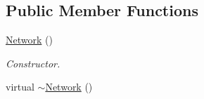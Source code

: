 \subsection*{Public Member Functions}
\begin{DoxyCompactItemize}
\item 
\hypertarget{classNetwork_a3cc2fb4f8fa4d507077e8da85ce5a1c8}{
\hyperlink{classNetwork_a3cc2fb4f8fa4d507077e8da85ce5a1c8}{Network} ()}
\label{classNetwork_a3cc2fb4f8fa4d507077e8da85ce5a1c8}

\begin{DoxyCompactList}\small\item\em Constructor. \item\end{DoxyCompactList}\item 
\hypertarget{classNetwork_a7a4e19cdb4bf0c7ecf82baa643831492}{
virtual \hyperlink{classNetwork_a7a4e19cdb4bf0c7ecf82baa643831492}{$\sim$Network} ()}
\label{classNetwork_a7a4e19cdb4bf0c7ecf82baa643831492}


\end{DoxyCompactItemize}
